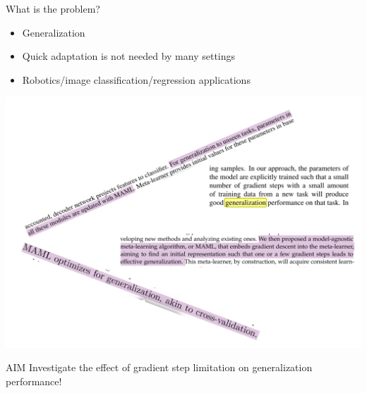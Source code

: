 \documentclass[aspectratio=169]{beamer}
\begin{document}
\begin{frame}{What is the problem?}
\begin{minipage}{0.5\textwidth}
  \begin{itemize}
    \item Generalization 
    \item Quick adaptation is not needed by many settings
    \item Robotics/image classification/regression applications
  \end{itemize}
\end{minipage}%
\begin{minipage}{0.5\textwidth}
  \centering
  \includegraphics[width=\textwidth]{figures/generalization}
\end{minipage}
\end{frame}


\begin{frame}{AIM}
  \centering
    \color{Pink} Investigate the effect of gradient step limitation on generalization performance!
\end{frame}    
\end{document}
